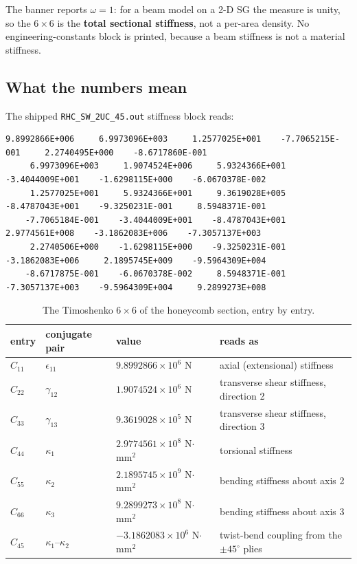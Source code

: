 The banner reports $\omega = 1$: for a beam model on a 2-D SG the measure is
unity, so the $6\times6$ is the \textbf{total sectional stiffness}, not a
per-area density. No engineering-constants block is printed, because a beam
stiffness is not a material stiffness.

\subsection{What the numbers mean}

The shipped \texttt{RHC\_SW\_2UC\_45.out} stiffness block reads:

\begin{lstlisting}[style=shellst,basicstyle=\ttfamily\tiny]
     9.8992866E+006     6.9973096E+003     1.2577025E+001    -7.7065215E-001     2.2740495E+000    -8.6717860E-001
     6.9973096E+003     1.9074524E+006     5.9324366E+001    -3.4044009E+001    -1.6298115E+000    -6.0670378E-002
     1.2577025E+001     5.9324366E+001     9.3619028E+005    -8.4787043E+001    -9.3250231E-001     8.5948371E-001
    -7.7065184E-001    -3.4044009E+001    -8.4787043E+001     2.9774561E+008    -3.1862083E+006    -7.3057137E+003
     2.2740506E+000    -1.6298115E+000    -9.3250231E-001    -3.1862083E+006     2.1895745E+009    -9.5964309E+004
    -8.6717875E-001    -6.0670378E-002     8.5948371E-001    -7.3057137E+003    -9.5964309E+004     9.2899273E+008
\end{lstlisting}

\begin{table}[htbp]
\centering
\small
\begin{tabular}{lllp{4.6cm}}
\toprule
entry & conjugate pair & value & reads as \\
\midrule
$C_{11}$ & $\epsilon_{11}$ & $9.8992866\times10^{6}$ N & axial (extensional) stiffness \\
$C_{22}$ & $\gamma_{12}$ & $1.9074524\times10^{6}$ N & transverse shear stiffness, direction 2 \\
$C_{33}$ & $\gamma_{13}$ & $9.3619028\times10^{5}$ N & transverse shear stiffness, direction 3 \\
$C_{44}$ & $\kappa_1$ & $2.9774561\times10^{8}$ N$\cdot$mm$^2$ & torsional stiffness \\
$C_{55}$ & $\kappa_2$ & $2.1895745\times10^{9}$ N$\cdot$mm$^2$ & bending stiffness about axis 2 \\
$C_{66}$ & $\kappa_3$ & $9.2899273\times10^{8}$ N$\cdot$mm$^2$ & bending stiffness about axis 3 \\
$C_{45}$ & $\kappa_1$--$\kappa_2$ & $-3.1862083\times10^{6}$ N$\cdot$mm$^2$ & twist-bend coupling from the $\pm45^\circ$ plies \\
\bottomrule
\end{tabular}
\caption{The Timoshenko $6\times6$ of the honeycomb section, entry by entry.}
\label{tab:solid-timo}
\end{table}

